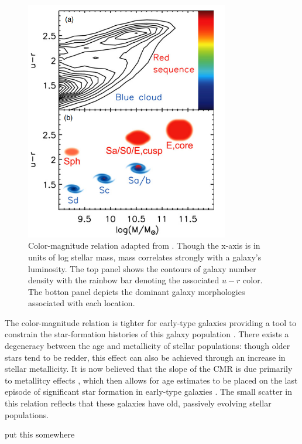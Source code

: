 \begin{figure}
\centering
\includegraphics[width=3.5in]{Figures/kormendy_CMR.png}
\caption[Galaxy color-magnitude relation.]{Color-magnitude relation adapted from \cite{Kormendy2012}. Though the x-axis is in units of log stellar mass, mass correlates strongly with a galaxy's luminosity. The top panel shows the contours of galaxy number density \citep{Baldry2004b} with the rainbow bar denoting the associated $u-r$ color. The botton panel depicts the dominant galaxy morphologies associated with each location.}
\label{fig: CMR}
\end{figure}

The color-magnitude relation is tighter for early-type galaxies providing a tool to constrain the star-formation histories of this galaxy population \citep{Sandage1978, Tully1982}. There exists a degeneracy between the age and metallicity of stellar populations: though older stars tend to be redder, this effect can also be achieved through an increase in stellar metallicity. It is now believed that the slope of the CMR is due primarily to metallitcy effects \citep{Bower1992, Kodama1997}, which then allows for age estimates to be placed on the last episode of significant star formation in early-type galaxies \citep[e.g.,][]{LopezCruz2004}. The small scatter in this relation reflects that these galaxies have old, passively evolving stellar populations. 

put this somewhere \citep{Mei2009}

